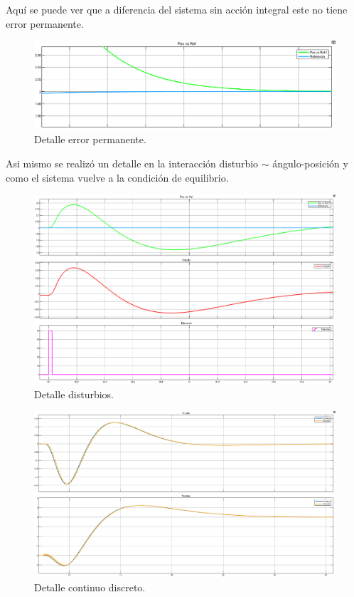 Aquí se puede ver que a diferencia del sistema sin acci\'on integral este no tiene error permanente.
\begin{figure}[H]
	\centering
	\includegraphics[width=1\linewidth]{Imagenes/Control_integral_disc/detalle_error_permanente.png}
	\caption{Detalle error permanente.}
	\label{realmentacion_error}
\end{figure}

Asi mismo se realizó un detalle en la interacción disturbio $\sim$ ángulo-posici\'on y como el sistema vuelve a la condici\'on de equilibrio.
\begin{figure}[H]
	\centering
	\includegraphics[width=1\linewidth]{Imagenes/Control_integral_disc/detalle_disturbio.png}
	\caption{Detalle disturbios.}
	\label{realmentacion_disturbio}
\end{figure}

\begin{figure}[H]
	\centering
	\includegraphics[width=1\linewidth]{Imagenes/Control_integral_disc/detalle_real_medido.png}
	\caption{Detalle continuo discreto.}
	\label{realmentacion_disturbio}
\end{figure}


